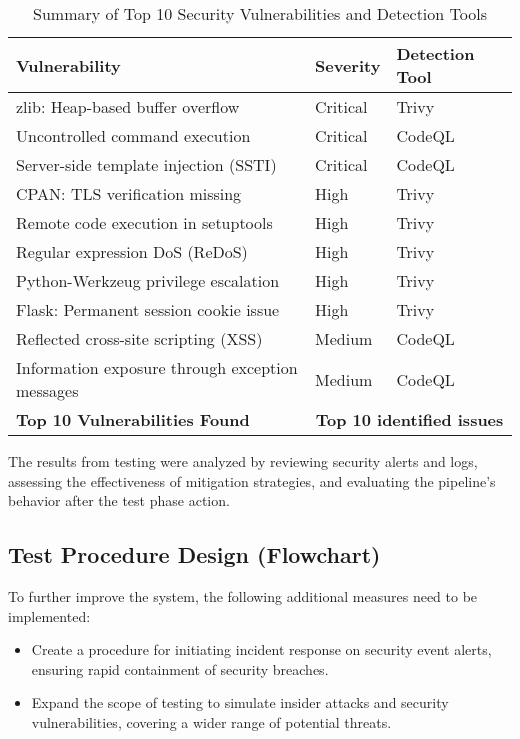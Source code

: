 \documentclass[conference]{IEEEtran}
\begin{document}
\begin{table}[t]
    \centering
    \caption{Summary of Top 10 Security Vulnerabilities and Detection Tools}
    \label{tab:vulnerability_analysis}
    \renewcommand{\arraystretch}{1.2} %
    \begin{tabular}{|p{3.5cm}|p{1.5cm}|p{2.0cm}|}
        \hline
        \textbf{Vulnerability} & \textbf{Severity} & \textbf{Detection Tool} \\
        \hline
        zlib: Heap-based buffer overflow & Critical & Trivy \\
        \hline
        Uncontrolled command execution & Critical & CodeQL \\
        \hline
        Server-side template injection (SSTI) & Critical & CodeQL \\
        \hline
        CPAN: TLS verification missing & High & Trivy \\
        \hline
        Remote code execution in setuptools & High & Trivy \\
        \hline
        Regular expression DoS (ReDoS) & High & Trivy \\
        \hline
        Python-Werkzeug privilege escalation & High & Trivy \\
        \hline
        Flask: Permanent session cookie issue & High & Trivy \\
        \hline
        Reflected cross-site scripting (XSS) & Medium & CodeQL \\
        \hline
        Information exposure through exception messages & Medium & CodeQL \\
        \hline
        \textbf{Top 10 Vulnerabilities Found} & \multicolumn{2}{c|}{\textbf{Top 10 identified issues}} \\
        \hline
    \end{tabular}
\end{table}

The results from testing were analyzed by reviewing security alerts and logs, assessing the effectiveness of mitigation strategies, and evaluating the pipeline's behavior after the test phase action.

\subsection{Test Procedure Design (Flowchart)}
To further improve the system, the following additional measures need to be implemented:
\begin{itemize}
    \item Create a procedure for initiating incident response on security event alerts, ensuring rapid containment of security breaches.
    \item Expand the scope of testing to simulate insider attacks and security vulnerabilities, covering a wider range of potential threats.
\end{itemize}
\end{document}
